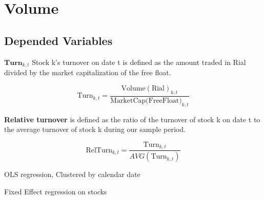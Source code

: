 \documentclass[12pt]{article}
\begin{document}
\FloatBarrier
\restoregeometry
\section{Volume}

\subsection{Depended Variables}

$ \textbf{Turn}_{k,t} $ Stock k's turnover on date t is defined as the amount traded in Rial divided by the market capitalization of the free float.

\begin{equation}
\text{Turn}_{k,t} = \frac{\text{Volume}(\text{Rial})_{k,t}}{\text{MarketCap(FreeFloat)}_{k,t}}
\end{equation}

\textbf{Relative turnover} is defined as the ratio of the turnover of stock k on date t to the average turnover of stock k during our sample period.

\begin{equation}
\text{RelTurn}_{k,t} = \frac{\text{Turn}_{k,t}}{AVG(\text{Turn}_{k,t})}
\end{equation}




\begin{table}[htbp]
\centering

\caption{OLS regression, Clustered by calendar date}
\end{table}

\begin{table}[htbp]
\centering

\caption{Fixed Effect regression on stocks}
\end{table}
\end{document}
